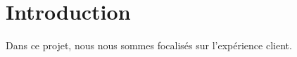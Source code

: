 \chapter*{Introduction}
	\thispagestyle{introduction}
	Dans ce projet, nous nous sommes focalisés sur l'expérience client.